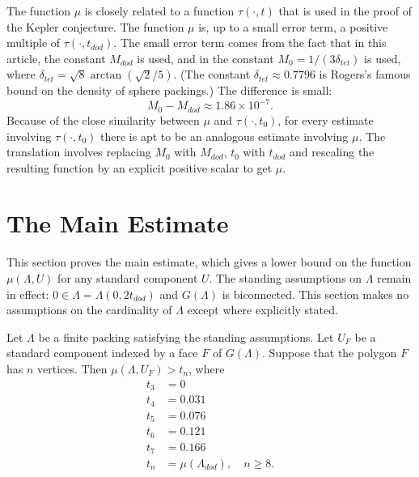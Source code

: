 \begin{remark}\label{rem:sq} The function $\mu$ is closely related to a function
$\tau(\cdot,t)$ that is used in the proof of the Kepler conjecture.  The
function $\mu$ is, up to a small error term, a positive multiple
of $\tau(\cdot,t_{dod})$.   The small
error term comes from the fact that in this article, the constant
$M_{dod}$ is used, and in \cite{DCG} the constant
$M_0=1/(3 \delta_{tet})$ is used, where $\delta_{tet} = \sqrt8 \arctan(\sqrt2/5)$.  (The constant $\delta_{tet}\approx 0.7796$ is Rogers's famous bound on the density of sphere packings.)  The difference is small:
   $$M_0 - M_{dod} \approx 1.86 \times 10^{-7}.$$
Because of the close similarity between $\mu$ and $\tau(\cdot,t_0)$,
for every estimate involving $\tau(\cdot,t_0)$ there is apt to
be an analogous estimate involving $\mu$.  The translation involves
replacing $M_0$ with $M_{dod}$, $t_0$ with $t_{dod}$ and rescaling the
resulting function by an explicit positive scalar to get $\mu$.
\end{remark}



\section{The Main Estimate}

This section proves the main estimate, which gives a lower
bound on the function $\mu(\Lambda,U)$ for any standard component $U$.
The standing
assumptions on $\Lambda$ remain in effect: $0\in\Lambda= \Lambda(0,2t_{dod})$ and $G(\Lambda)$ is  biconnected.  This section makes
no assumptions on the cardinality 
of $\Lambda$ except where explicitly stated.

\begin{theorem}\label{thm:main}  
Let $\Lambda$ be a finite packing satisfying the
standing assumptions.  Let $U_F$ be a standard component indexed by
a face $F$ of $G(\Lambda)$.  Suppose that the polygon 
$F$ has $n$ vertices.  Then
   $\mu(\Lambda,U_F) > t_n$, where 
$$
\begin{array}{lll}
 t_3 &= 0\\
 t_4 &= 0.031\\
 t_5 &= 0.076\\
 t_6 &= 0.121\\
 t_7 &= 0.166\\
 t_n &= \mu(\Lambda_{dod}),\quad n\ge 8.
\end{array}
$$
\end{theorem}

